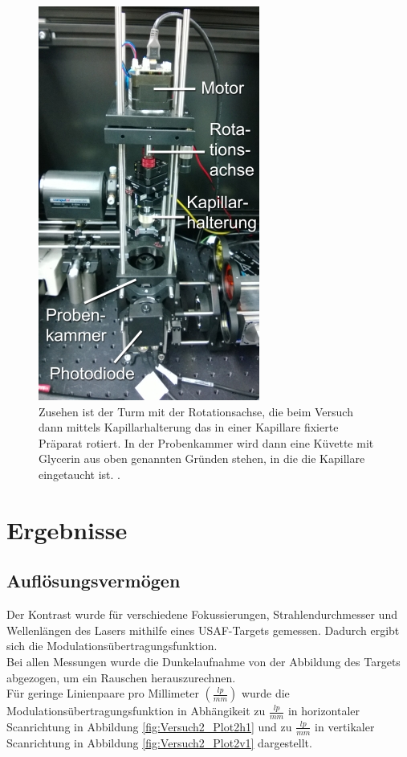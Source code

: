 \clearpage

\begin{figure}[H]
	\centering
\includegraphics[width=0.491\linewidth]{IMAGE/turm.png}
	\caption{Zusehen ist der Turm mit der Rotationsachse, die beim Versuch dann mittels Kapillarhalterung das in einer Kapillare fixierte Präparat rotiert.
In der Probenkammer wird dann eine Küvette mit Glycerin aus oben genannten Gründen stehen, in die die Kapillare eingetaucht ist. \cite{Anleitung}.
	}
	\label{fig:turm}
\end{figure}

\section{Ergebnisse}
\subsection{Auflösungsvermögen}
Der Kontrast wurde für verschiedene Fokussierungen, Strahlendurchmesser und Wellenlängen des Lasers mithilfe eines USAF-Targets gemessen. Dadurch ergibt sich die Modulationsübertragungsfunktion.\\ 
Bei allen Messungen wurde die Dunkelaufnahme von der Abbildung des Targets abgezogen, um ein Rauschen herauszurechnen.\\
	Für geringe Linienpaare pro Millimeter $\left( \frac{lp}{mm} \right)$ wurde die Modulationsübertragungsfunktion  in Abhängikeit zu $\frac{lp}{mm}$ in horizontaler Scanrichtung in Abbildung \ref{fig:Versuch2_Plot2h1} und zu $\frac{lp}{mm}$ in vertikaler Scanrichtung in Abbildung \ref{fig:Versuch2_Plot2v1} dargestellt.\\

